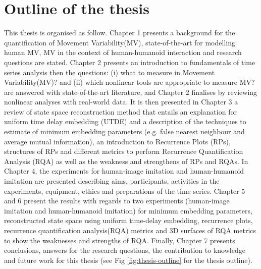 \section{Outline of the thesis}
This thesis is organised as follow. 
Chapter 1 presents a background for the quantification of 
Movement Variability(MV), state-of-the-art for modelling human MV,
MV in the context of human-humanoid interaction and research questions
are stated.
Chapter 2 presents an introduction to fundamentals of time series
analysis then the questions: (i) what to measure in Movement Variability(MV)?
and (ii) which nonlinear tools are appropriate to measure MV? are 
answered with state-of-the-art literature, and 
Chapter 2 finalises by reviewing nonlinear analyses with real-world data.
It is then presented in Chapter 3 a review of state space 
reconstruction method that entails an explanation for uniform time 
delay embedding (UTDE) and a description of the techniques to estimate 
of minimum embedding parameters (e.g. false nearest neighbour and 
average mutual information), an introduction to Recurrence Plots (RPs),
structures of RPs and different metrics to perform 
Recurrence Quantification Analysis (RQA) as well as the 
weakness and strengthens of RPs and RQAs.
In Chapter 4, the experiments for human-image imitation and human-humanoid 
imitation are presented describing aims, participants, activities in the 
experiments, equipment, ethics and preparations of the time series.
Chapter 5 and 6 present the results with regards to two experiments
(human-image imitation and human-humanoid imitation) for 
minimum embedding parameters, reconstructed state space using 
uniform time-delay embedding, recurrence plots, recurrence quantification 
analysis(RQA) metrics and 3D surfaces of RQA metrics to show the
weaknesses and strengths of RQA.
Finally, Chapter 7 presents conclusions, answers for the
research questions, the contribution to knowledge and 
future work for this thesis
(see Fig \ref{fig:thesis-outline} for the thesis outline).
